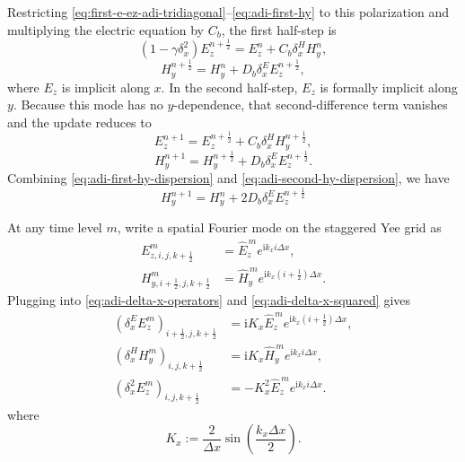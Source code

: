 \documentclass{article}
\numberwithin{equation}{section}
\numberwithin{figure}{section}
\begin{document}
Restricting \eqref{eq:first-e-ez-adi-tridiagonal}--\eqref{eq:adi-first-hy} to this polarization and multiplying the electric equation by $C_b$, the first half-step is
\begin{equation}
    \left(1-\gamma\delta_x^2\right)E_z^{n+\frac12}
    =E_z^n+C_b\delta_x^{H}H_y^n,
    \label{eq:first-e-ez-adi-tridiagonal-dispersion}
\end{equation}
\begin{equation}
    H_y^{n+\frac12}=H_y^n+D_b\delta_x^{E}E_z^{n+\frac12},
    \label{eq:adi-first-hy-dispersion}
\end{equation}
where $E_z$ is implicit along $x$. In the second half-step, $E_z$ is formally implicit along $y$. Because this mode has no $y$-dependence, that second-difference term vanishes and the update reduces to
\begin{equation}
    E_z^{n+1}=E_z^{n+\frac12}+C_b\delta_x^{H}H_y^{n+\frac12},
    \label{eq:second-e-ez-adi-tridiagonal-dispersion}
\end{equation}
\begin{equation}
    H_y^{n+1}=H_y^{n+\frac12}+D_b\delta_x^{E}E_z^{n+\frac12}.
    \label{eq:adi-second-hy-dispersion}
\end{equation}
Combining \eqref{eq:adi-first-hy-dispersion} and \eqref{eq:adi-second-hy-dispersion}, we have
\begin{equation}
    H_y^{n+1}=H_y^n+2D_b\delta_x^{E}E_z^{n+\frac12}
    \label{eq:adi-dispersion-full-hy}
\end{equation}

At any time level $m$, write a spatial Fourier mode on the staggered Yee grid as
\begin{align}
    E_{z,i,j,k+\tfrac12}^{m}          & =\widehat E_z^{\,m}e^{\mathrm{i}k_xi\Delta x},            \\
    H_{y,i+\tfrac12,j,k+\tfrac12}^{m} & =\widehat H_y^{\,m}e^{\mathrm{i}k_x(i+\tfrac12)\Delta x}.
    \label{eq:adi-dispersion-spatial-mode}
\end{align}
Plugging into \eqref{eq:adi-delta-x-operators} and \eqref{eq:adi-delta-x-squared} gives
\begin{subequations}
    \begin{align}
        \left(\delta_x^{E}E_z^m\right)_{i+\tfrac12,j,k+\tfrac12} & = \mathrm{i}K_x\widehat E_z^{\,m}e^{\mathrm{i}k_x(i+\tfrac12)\Delta x}, \\
        \left(\delta_x^{H}H_y^m\right)_{i,j,k+\tfrac12}          & = \mathrm{i}K_x\widehat H_y^{\,m}e^{\mathrm{i}k_xi\Delta x},            \\
        \left(\delta_x^2E_z^m\right)_{i,j,k+\tfrac12}            & =-K_x^2\widehat E_z^{\,m}e^{\mathrm{i}k_xi\Delta x}.
    \end{align}
    \label{eq:adi-delta-x-fourier}
\end{subequations}
where
\begin{equation}
    K_x:=\frac{2}{\Delta x}\sin\!\left(\frac{k_x\Delta x}{2}\right).
    \label{eq:adi-Kx}
\end{equation}
\end{document}
